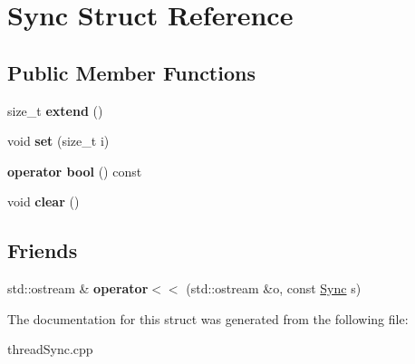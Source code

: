 \hypertarget{structSync}{}\section{Sync Struct Reference}
\label{structSync}
\subsection*{Public Member Functions}
\begin{DoxyCompactItemize}
\item 
size\+\_\+t {\bfseries extend} ()\hypertarget{structSync_a12dd998a8af839e5e5663020f1607863}{}\label{structSync_a12dd998a8af839e5e5663020f1607863}

\item 
void {\bfseries set} (size\+\_\+t i)\hypertarget{structSync_a11ca0966d2a696487fd3eb2c5b85f393}{}\label{structSync_a11ca0966d2a696487fd3eb2c5b85f393}

\item 
{\bfseries operator bool} () const \hypertarget{structSync_a3a6cb3be79398ad788421bea42d90c7a}{}\label{structSync_a3a6cb3be79398ad788421bea42d90c7a}

\item 
void {\bfseries clear} ()\hypertarget{structSync_a41d73e5a06d373973cf50d439e132d11}{}\label{structSync_a41d73e5a06d373973cf50d439e132d11}

\end{DoxyCompactItemize}
\subsection*{Friends}
\begin{DoxyCompactItemize}
\item 
std\+::ostream \& {\bfseries operator$<$$<$} (std\+::ostream \&o, const \hyperlink{structSync}{Sync} s)\hypertarget{structSync_a1f4fd6c9f4d959c189137a370dc24d29}{}\label{structSync_a1f4fd6c9f4d959c189137a370dc24d29}

\end{DoxyCompactItemize}


The documentation for this struct was generated from the following file\+:\begin{DoxyCompactItemize}
\item 
thread\+Sync.\+cpp\end{DoxyCompactItemize}
